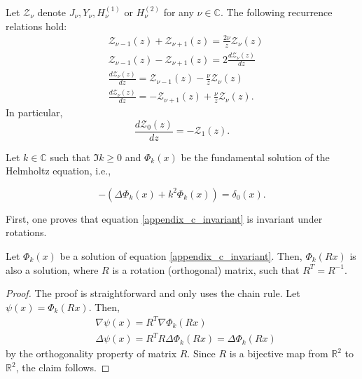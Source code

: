 \begin{proposition}\label{recurrence_bessel_appendix_c}
    Let \(\mathcal{Z}_\nu\) denote \(J_\nu, Y_\nu, H^{(1)}_\nu\) or \(H^{(2)}_\nu\) for any \(\nu \in \mathbb{C}\). The following recurrence relations hold:
    \begin{align*}
        &\mathcal{Z}_{\nu-1}(z) + \mathcal{Z}_{\nu+1}(z) = \frac{2 \nu}{z}\mathcal{Z}_{\nu}(z)\\
        &\mathcal{Z}_{\nu-1}(z) - \mathcal{Z}_{\nu+1}(z) = 2\frac{d \mathcal{Z}_{\nu}(z)}{dz}\\
        &\frac{d \mathcal{Z}_{\nu}(z)}{dz} = \mathcal{Z}_{\nu-1}(z) - \frac{\nu}{z}\mathcal{Z}_{\nu}(z) \\
        &\frac{d \mathcal{Z}_{\nu}(z)}{dz} = -\mathcal{Z}_{\nu+1}(z) + \frac{\nu}{z}\mathcal{Z}_{\nu}(z).
    \end{align*}
    In particular,
    \[
        \frac{d \mathcal{Z}_{0}(z)}{dz} = -\mathcal{Z}_{1}(z).
    \]
\end{proposition}

Let \(k \in \mathbb{C}\) such that \(\Im{k} \geq 0\) and \(\Phi_k(x)\) be the fundamental solution of the Helmholtz equation, i.e.,

\begin{equation}\label{appendix_c_invariant}
    -\left(\Delta \Phi_k(x) + k^2 \Phi_k(x)\right) = \delta_0(x).
\end{equation}

First, one proves that equation \eqref{appendix_c_invariant} is invariant under rotations.

\begin{lemma}\label{invariant_lemma}
    Let \(\Phi_k(x)\) be a solution of equation \eqref{appendix_c_invariant}. Then, \(\Phi_k(R x)\) is also a solution, where \(R\) is a rotation (orthogonal) matrix, such that \(R^T = R^{-1}\).
\end{lemma}
\begin{proof}
    The proof is straightforward and only uses the chain rule. Let \(\psi(x) = \Phi_k(Rx)\). Then,
    \begin{align*}
        &\nabla \psi(x) = R^T \nabla \Phi_k(R x)\\
        &\Delta \psi(x) = R^T R \Delta \Phi_k(R x) = \Delta \Phi_k(R x)
    \end{align*}
    by the orthogonality property of matrix \(R\). Since \(R\) is a bijective map from \(\mathbb{R}^2\) to \(\mathbb{R}^2\), the claim follows.
\end{proof}


